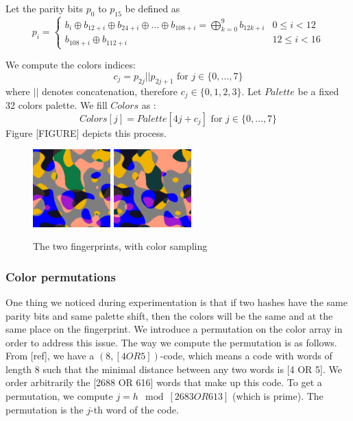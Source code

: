 \documentclass{article}
\begin{document}
Let the parity bits $p_0$ to $p_{15}$ be defined as 
\begin{equation*}
	p_i = \begin{cases} 
	    b_{i} \oplus b_{12+i} \oplus b_{24+i} \oplus \dots \oplus b_{108+i} = \bigoplus_{k=0}^9 b_{12k+i} & 0 \leq i < 12\\
	    b_{108 + i} \oplus b_{112 + i} & 12 \leq i < 16
	    \end{cases}
\end{equation*}

We compute the colors indices:
 $$c_j = p_{2j} || p_{2j+1} \text{ for } j \in \{0,\dotsc,7\}$$ where $||$ denotes concatenation, therefore $c_j \in \{0,1,2,3\}$.
 Let $Palette$ be a fixed 32 colors palette. We fill $Colors$ as :
$$Colors[j] = Palette[4j + c_j] \text{ for } j \in \{0, \dotsc, 7\}$$
Figure [FIGURE] depicts this process.

\begin{center}
\begin{figure}
    \centering
    \includegraphics[width=3cm]{figures/Colors.png}
    \hspace{3pt}
    \includegraphics[width=3cm]{figures/ColorsP67Psi02058.png}
    \caption{The two fingerprints, with color sampling}
    \label{fig:threeFuncsColor}
\end{figure}
\end{center}

\subsubsection{Color permutations}

One thing we noticed during experimentation is that if two hashes have the same parity bits and same palette shift, then the colors will be the same and at the same place on the fingerprint. We introduce a permutation on the color array in order to address this issue. The way we compute the permutation is as follows. From [ref], we have a $(8, [4 OR 5])$-code, which means a code with words of length 8 such that the minimal distance between any two words is [4 OR 5]. We order arbitrarily the [2688 OR 616] words that make up this code. To get a permutation, we compute $j = h \mod [2683 OR 613]$ (which is prime). The permutation is the $j$-th word of the code.
\end{document}
